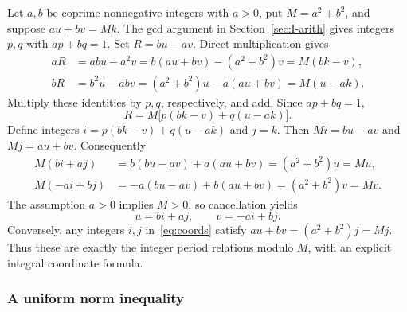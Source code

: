 \documentclass{article}
\numberwithin{equation}{section}
\begin{document}
Let \(a,b\) be coprime nonnegative integers with \(a>0\), put \(M=a^2+b^2\),
and suppose \(au+bv=Mk\). The gcd argument in Section~\ref{sec:I-arith} gives
integers \(p,q\) with \(ap+bq=1\). Set \(R=bu-av\). Direct multiplication gives
\begin{equation}\label{eq:aR-bR}
  \begin{aligned}
    aR&=ab u-a^2v=b(au+bv)-(a^2+b^2)v=M(bk-v),\\
    bR&=b^2u-abv=(a^2+b^2)u-a(au+bv)=M(u-ak).
  \end{aligned}
\end{equation}
Multiply these identities by \(p,q\), respectively, and add. Since \(ap+bq=1\),
\begin{equation}\label{eq:R}
  R=M\bigl[p(bk-v)+q(u-ak)\bigr].
\end{equation}
Define integers \(i=p(bk-v)+q(u-ak)\) and \(j=k\). Then
\(Mi=bu-av\) and \(Mj=au+bv\). Consequently
\begin{equation}\label{eq:Mu-Mv}
  \begin{aligned}
    M(bi+aj)&=b(bu-av)+a(au+bv)=(a^2+b^2)u=Mu,\\
    M(-ai+bj)&=-a(bu-av)+b(au+bv)=(a^2+b^2)v=Mv.
  \end{aligned}
\end{equation}
The assumption \(a>0\) implies \(M>0\), so cancellation yields
\begin{equation}\label{eq:coords}
  u=bi+aj,\qquad v=-ai+bj.
\end{equation}
Conversely, any integers \(i,j\) in~\eqref{eq:coords} satisfy
\(au+bv=(a^2+b^2)j=Mj\). Thus these are exactly the integer period
relations modulo \(M\), with an explicit integral coordinate formula.

\subsubsection{A uniform norm inequality}\label{sec:I-norm}
\end{document}
